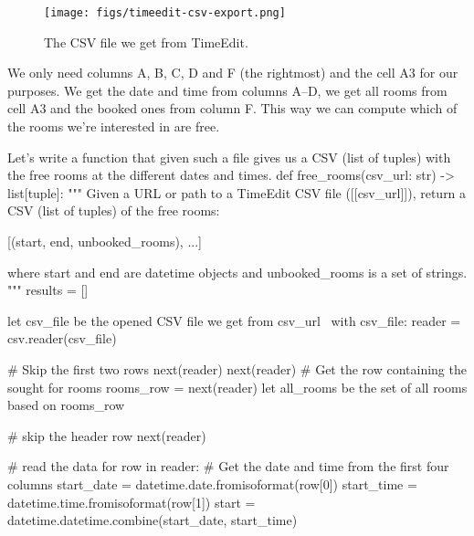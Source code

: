 \begin{figure}
  \centering
  \begin{fullwidth}
  \texttt{[image: figs/timeedit-csv-export.png]}
  \caption{The CSV file we get from TimeEdit.}
  \label{fig:TimeEditCSVexport}
  \end{fullwidth}
\end{figure}

We only need columns A, B, C, D and F (the rightmost) and the cell A3 for our 
purposes.
We get the date and time from columns A--D, we get all rooms from cell A3 and 
the booked ones from column F.
This way we can compute which of the rooms we're interested in are free.

Let's write a function that given such a file gives us a CSV (list of tuples) 
with the free rooms at the different dates and times.
\nwenddocs{}\endmoddef\nwstartdeflinemarkup{}\nwenddeflinemarkup
def free_rooms(csv_url: str) -> list[tuple]:
  """
  Given a URL or path to a TimeEdit CSV file ([[csv_url]]),
  return a CSV (list of tuples) of the free rooms:

  [(start, end, unbooked_rooms), ...]

  where start and end are datetime objects and unbooked_rooms is a set of 
  strings.
  """
  results = []

  \LA{}let \code{}csv{\_}file\edoc{} be the opened CSV file we get from \code{}csv{\_}url\edoc{}~{\nwtagstyle{}}\RA{}
  with csv_file:
    reader = csv.reader(csv_file)

    # Skip the first two rows
    next(reader)
    next(reader)
    # Get the row containing the sought for rooms
    rooms_row = next(reader)
    \LA{}let \code{}all{\_}rooms\edoc{} be the set of all rooms based on \code{}rooms{\_}row\edoc{}~{\nwtagstyle{}}\RA{}

    # skip the header row
    next(reader)

    # read the data
    for row in reader:
      # Get the date and time from the first four columns
      start_date = datetime.date.fromisoformat(row[0])
      start_time = datetime.time.fromisoformat(row[1])
      start = datetime.datetime.combine(start_date, start_time)

